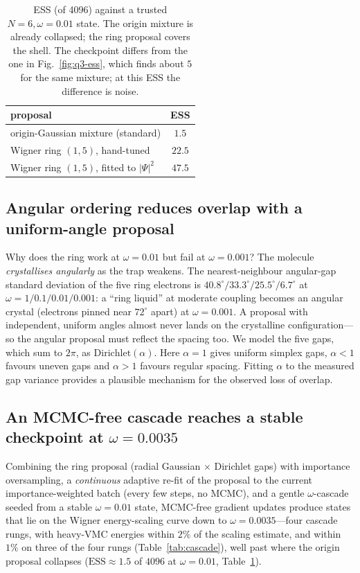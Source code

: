 \begin{table}[htbp]\centering
\caption[ESS of the origin and Wigner-ring proposals]{ESS (of 4096) against a trusted $N=6,\omega=0.01$ state. The origin mixture is
already collapsed; the ring proposal covers the shell. The checkpoint differs from the one in
Fig.~\ref{fig:q3-ess}, which finds about $5$ for the same mixture; at this ESS the difference
is noise.}
\label{tab:ring-ess}
\begin{tabular}{lc}
\hline
proposal & ESS \\
\hline
origin-Gaussian mixture (standard) & $1.5$ \\
Wigner ring $(1,5)$, hand-tuned & $22.5$ \\
Wigner ring $(1,5)$, fitted to $|\Psi|^2$ & $47.5$ \\
\hline
\end{tabular}
\end{table}

\subsection{Angular ordering reduces overlap with a uniform-angle proposal}
Why does the ring work at $\omega=0.01$ but fail at $\omega=0.001$? The molecule
\emph{crystallises angularly} as the trap weakens. The nearest-neighbour angular-gap
standard deviation of the five ring electrons is $40.8^\circ/33.3^\circ/25.5^\circ/6.7^\circ$
at $\omega=1/0.1/0.01/0.001$: a ``ring liquid'' at moderate coupling becomes an angular
crystal (electrons pinned near $72^\circ$ apart) at $\omega=0.001$. A proposal with
independent, uniform angles almost never lands on the crystalline configuration---so the
angular proposal must reflect the spacing too. We model the five gaps, which sum to $2\pi$,
as $\mathrm{Dirichlet}(\alpha)$. Here $\alpha=1$ gives uniform simplex gaps,
$\alpha<1$ favours uneven gaps and $\alpha>1$ favours regular spacing. Fitting $\alpha$ to
the measured gap variance provides a plausible mechanism for the observed loss of overlap.

\subsection{An MCMC-free cascade reaches a stable checkpoint at $\omega=0.0035$}
Combining the ring proposal (radial Gaussian $\times$ Dirichlet gaps) with importance
oversampling, a \emph{continuous} adaptive re-fit of the proposal to the current
importance-weighted batch (every few steps, no MCMC), and a gentle $\omega$-cascade
seeded from a stable $\omega=0.01$ state, MCMC-free gradient updates produce states that
lie on the Wigner energy-scaling curve down to $\omega=0.0035$---four cascade rungs, with
heavy-VMC energies within $2\%$ of the scaling estimate, and within $1\%$ on three of the
four rungs (Table~\ref{tab:cascade}),
well past where the origin proposal collapses ($\mathrm{ESS}\!\approx\!1.5$ of $4096$ at
$\omega=0.01$, Table~\ref{tab:ring-ess}).

